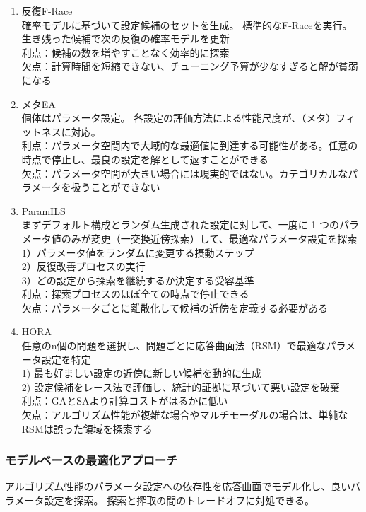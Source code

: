 \documentclass[twocolumn]{jarticle}     %
\begin{document}
\begin{enumerate}
  \item 反復F-Race \\
  確率モデルに基づいて設定候補のセットを生成。
  標準的なF-Raceを実行。
  生き残った候補で次の反復の確率モデルを更新\\
  利点：候補の数を増やすことなく効率的に探索\\
  欠点：計算時間を短縮できない、チューニング予算が少なすぎると解が貧弱になる

  \item メタEA \\
  個体はパラメータ設定。
  各設定の評価方法による性能尺度が、（メタ）フィットネスに対応。\\
  利点：パラメータ空間内で大域的な最適値に到達する可能性がある。任意の時点で停止し、最良の設定を解として返すことができる\\
  欠点：パラメータ空間が大きい場合には現実的ではない。カテゴリカルなパラメータを扱うことができない

  \item ParamILS \\
  まずデフォルト構成とランダム生成された設定に対して、一度に 1 つのパラメータ値のみが変更（一交換近傍探索）して、最適なパラメータ設定を探索\\
  1）パラメータ値をランダムに変更する摂動ステップ\\
  2）反復改善プロセスの実行\\
  3）どの設定から探索を継続するか決定する受容基準\\
  利点：探索プロセスのほぼ全ての時点で停止できる\\
  欠点：パラメータごとに離散化して候補の近傍を定義する必要がある

  \item HORA \\
  任意のn個の問題を選択し、問題ごとに応答曲面法（RSM）で最適なパラメータ設定を特定\\
  1) 最も好ましい設定の近傍に新しい候補を動的に生成\\
  2) 設定候補をレース法で評価し、統計的証拠に基づいて悪い設定を破棄\\
  利点：GAとSAより計算コストがはるかに低い\\
  欠点：アルゴリズム性能が複雑な場合やマルチモーダルの場合は、単純なRSMは誤った領域を探索する
\end{enumerate}

\subsubsection{モデルベースの最適化アプローチ}
アルゴリズム性能のパラメータ設定への依存性を応答曲面でモデル化し、良いパラメータ設定を探索。
探索と搾取の間のトレードオフに対処できる。
\end{document}
